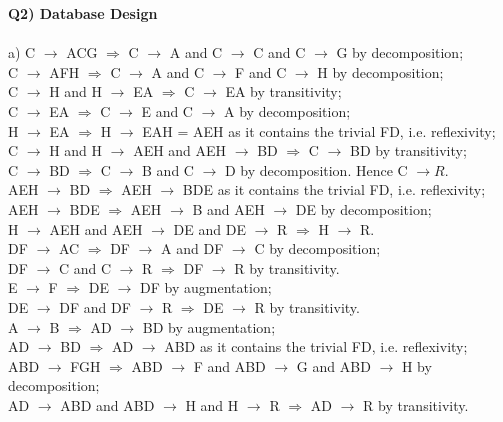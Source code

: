 \documentclass[12pt]{article}
\begin{document}
\newpage
\textbf{Q2) Database Design}\\
\\
a) C $\rightarrow$ ACG $\Rightarrow$ C $\rightarrow$ A and C $\rightarrow$ C and C $\rightarrow$ G by decomposition;\\
C $\rightarrow$ AFH $\Rightarrow$ C $\rightarrow$ A and C $\rightarrow$ F and C $\rightarrow$ H by decomposition;\\
C $\rightarrow$ H and H $\rightarrow$ EA $\Rightarrow$ C $\rightarrow$ EA by transitivity;\\
C $\rightarrow$ EA $\Rightarrow$ C $\rightarrow$ E and C $\rightarrow$ A by decomposition;\\
H $\rightarrow$ EA $\Rightarrow$ H $\rightarrow$ EAH = AEH as it contains the trivial FD, i.e. reflexivity;\\
C $\rightarrow$ H and H $\rightarrow$ AEH and AEH $\rightarrow$ BD $\Rightarrow$ C $\rightarrow$ BD by transitivity;\\
C $\rightarrow$ BD $\Rightarrow$ C $\rightarrow$ B and C $\rightarrow$ D by decomposition. Hence C $\rightarrow R.$\\
AEH $\rightarrow$ BD $\Rightarrow$ AEH $\rightarrow$ BDE as it contains the trivial FD, i.e. reflexivity;\\
AEH $\rightarrow$ BDE $\Rightarrow$ AEH $\rightarrow$ B and AEH $\rightarrow$ DE by decomposition;\\
H $\rightarrow$ AEH and AEH $\rightarrow$ DE and DE $\rightarrow$ R $\Rightarrow$ H $\rightarrow$ R.\\
DF $\rightarrow$ AC $\Rightarrow$ DF $\rightarrow$ A and DF $\rightarrow$ C by decomposition;\\
DF $\rightarrow$ C and C $\rightarrow$ R $\Rightarrow$ DF $\rightarrow$ R by transitivity.\\
E $\rightarrow$ F $\Rightarrow$ DE $\rightarrow$ DF by augmentation;\\
DE $\rightarrow$ DF and DF $\rightarrow$ R $\Rightarrow$ DE $\rightarrow$ R by transitivity.\\
A $\rightarrow$ B $\Rightarrow$ AD $\rightarrow$ BD by augmentation;\\
AD $\rightarrow$ BD $\Rightarrow$ AD $\rightarrow$ ABD as it contains the trivial FD, i.e. reflexivity;\\
ABD $\rightarrow$ FGH $\Rightarrow$ ABD $\rightarrow$ F and ABD $\rightarrow$ G and ABD $\rightarrow$ H by decomposition;\\
AD $\rightarrow$ ABD and ABD $\rightarrow$ H and H $\rightarrow$ R $\Rightarrow$ AD $\rightarrow$ R by transitivity.\\
\end{document}
